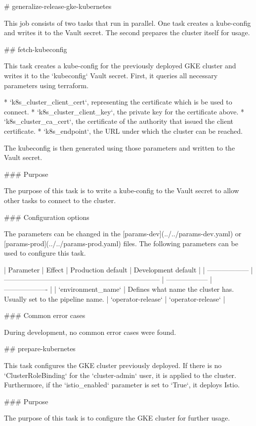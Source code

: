 # generalize-release-gke-kubernetes

This job consists of two tasks that run in parallel.
One task creates a kube-config and writes it to the Vault secret.
The second prepares the cluster itself for usage.

## fetch-kubeconfig

This task creates a kube-config for the previously deployed GKE cluster and writes it to the `kubeconfig` Vault secret.
First, it queries all necessary parameters using terraform.

* `k8s_cluster_client_cert`, representing the certificate which is be used to connect.
* `k8s_cluster_client_key`, the private key for the certificate above.
*  `k8s_cluster_ca_cert`, the certificate of the authority that issued the client certificate.
*  `k8s_endpoint`, the URL under which the cluster can be reached.

The kubeconfig is then generated using those parameters and written to the Vault secret.

### Purpose

The purpose of this task is to write a kube-config to the Vault secret to allow other tasks to connect to the cluster.

### Configuration options

The parameters can be changed in the [params-dev](../../params-dev.yaml) or [params-prod](../../params-prod.yaml) files.
The following parameters can be used to configure this task.

| Parameter          | Effect                                                               | Production default | Development default |
| ------------------ | -------------------------------------------------------------------- | ------------------ | ------------------- |
| `environment_name` | Defines what name the cluster has. Usually set to the pipeline name. | `operator-release` | `operator-release`  |

### Common error cases

During development, no common error cases were found.

## prepare-kubernetes

This task configures the GKE cluster previously deployed.
If there is no `ClusterRoleBinding` for the `cluster-admin` user, it is applied to the cluster.
Furthermore, if the `{istio_enabled}` parameter is set to `True`, it deploys Istio.

### Purpose

The purpose of this task is to configure the GKE cluster for further usage.

